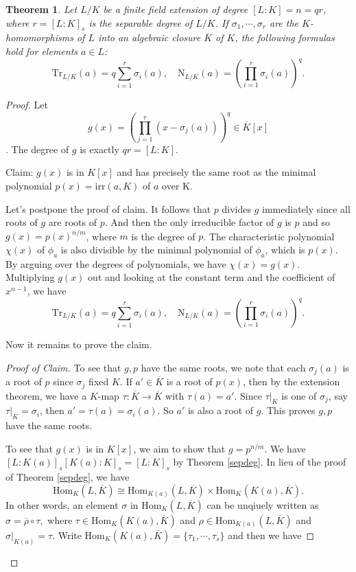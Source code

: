 \documentclass[12pt]{report}
\newtheorem{thm}{Theorem}[section]
\theoremstyle{definition}
\def\Tr{\text{Tr}}
\def\nm{\text{N}}
\def\Hom{\text{Hom}}
\def\irr{\text{irr}}
\def\ok{\overline{K}}
\begin{document}
\begin{thm}\label{trnmfor}
    Let $L/K$ be a finite field extension of degree $[L : K] =n= qr$, where $r = [L : K]_s$ is the separable degree of $L/K$. If $\sigma_1, \cdots , \sigma_r$ are the $K$-homomorphisms of $L$ into an algebraic closure $\overline{K}$ of $K$, the following formulas hold for elements $a \in L$: $$\Tr_{L/K}(a)=q\sum_{i=1}^r \sigma_i(a),\quad \nm_{L/K}(a) = (\prod_{i=1}^r \sigma_i(a))^q. $$ 
\end{thm}

\begin{proof}
    Let $$g(x)=(\prod_{j=1}^r(x-\sigma_j(a)))^q \in \ok[x]$$. The degree of $g$ is exactly $qr=[L:K]$.

    Claim: $g(x)$ is in $K[x]$ and has precisely the same root as the minimal polynomial $p(x)=\irr(a,K)$ of $a$ over K.
    
    Let's postpone the proof of claim. It follows that $p$ divides $g$ immediately since all roots of $g$ are roots of $p$.  And then the only irreducible factor of $g$ is $p$ and so $g(x)=p(x)^{n/m}$, where $m$ is the degree of $p$. The characteristic polynomial $\chi(x)$ of $\phi_a$ is also divisible by the minimal polynomial of $\phi_a$, which is $p(x)$. By arguing over the degrees of polynomials, we have $\chi(x)=g(x)$. Multiplying $g(x)$ out and looking at the constant term and the coefficient of $x^{n-1}$, we have $$\Tr_{L/K}(a)=q\sum_{i=1}^r \sigma_i(a),\quad \nm_{L/K}(a) = (\prod_{i=1}^r \sigma_i(a))^q. $$

    Now it remains to prove the claim.
    \begin{proof}[Proof of Claim]
        To see that $g,p$ have the same roots, we note that each $\sigma_j(a)$ is a root of $p$ since $\sigma_j$ fixed $K$. If $a'\in \ok$ is a root of $p(x)$, then by the extension theorem, we have a $K$-map $\tau:\ok\to \ok$ with $\tau(a)=a'$. Since $\tau|_K$ is one of $\sigma_j$, say $\tau|_K=\sigma_i$, then $a'=\tau(a)=\sigma_i(a)$. So $a'$ is also a root of $g$. This proves $g,p$ have the same roots.
        
        To see that $g(x)$ is in $K[x]$, we aim to show that $g=p^{n/m}$. We have $[L:K(a)]_s [K(a):K]_s=[L:K]_s$ by Theorem \ref{sepdeg}. In lieu of the proof of Theorem \ref{sepdeg}, we have $$\Hom_K(L,\ok)\cong \Hom_{K(a)}(L,\ok)\times\Hom_K(K(a),\ok).$$ In other words, an element $\sigma$ in $\Hom_K(L,\ok)$ can be unqiuely written as $\sigma = \overline{\rho}\circ\tau,$ where $\tau\in\Hom_K(K(a),\ok)$ and $\rho\in  \Hom_{K(a)}(L,\ok)$ and $\sigma|_{K(a)}=\tau$. Write $\Hom_K(K(a),\ok)=\{\tau_1,\cdots,\tau_s\}$ and then we have  


\end{proof}
\end{proof}
\end{document}
